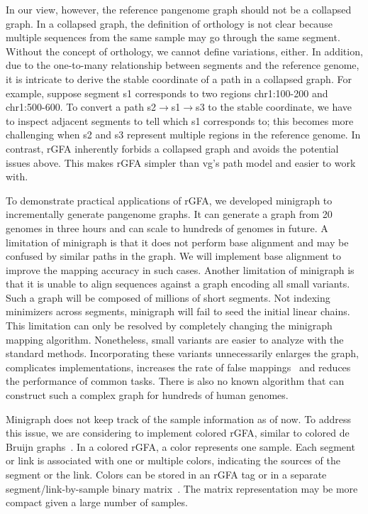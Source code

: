 \documentclass[twocolumn]{bmcart}
\begin{document}
In our view, however, the reference pangenome graph should not be a collapsed
graph. In a collapsed graph, the definition of orthology is not clear because
multiple sequences from the same sample may go through the same segment.
Without the concept of orthology, we cannot define variations, either.  In
addition, due to the one-to-many relationship between segments and the
reference genome, it is intricate to derive the stable coordinate of a path in
a collapsed graph. For example, suppose segment {\sf s1} corresponds to two
regions {\sf chr1:100-200} and {\sf chr1:500-600}. To convert a path {\sf
s2$\to$s1$\to$s3} to the stable coordinate, we have to inspect adjacent
segments to tell which {\sf s1} corresponds to; this becomes more challenging
when {\sf s2} and {\sf s3} represent multiple regions in the reference genome.
In contrast, rGFA inherently forbids a collapsed graph and avoids the potential
issues above. This makes rGFA simpler than vg's path model and easier to work
with.

To demonstrate practical applications of rGFA, we developed minigraph to
incrementally generate pangenome graphs. It can generate a graph from 20
genomes in three hours and can scale to hundreds of genomes in future. A
limitation of minigraph is that it does not perform base alignment and may be
confused by similar paths in the graph. We will implement base alignment to
improve the mapping accuracy in such cases. Another limitation of minigraph is
that it is unable to align sequences against a graph encoding all small variants.
Such a graph will be composed of millions of short segments. Not
indexing minimizers across segments, minigraph will fail to seed the initial
linear chains. This limitation can only be resolved by completely changing the
minigraph mapping algorithm. Nonetheless, small variants are easier to
analyze with the standard methods. Incorporating these variants unnecessarily
enlarges the graph, complicates implementations, increases the rate of false
mappings~\cite{Pritt_2018} and reduces the performance of common tasks. There
is also no known algorithm that can construct such a complex graph for hundreds
of human genomes.

Minigraph does not keep track of the sample information as of now. To address
this issue, we are considering to implement colored rGFA, similar to colored de
Bruijn graphs~\cite{Iqbal:2012aa}. In a colored rGFA, a color represents one
sample.  Each segment or link is associated with one or multiple colors,
indicating the sources of the segment or the link. Colors can be stored in an
rGFA tag or in a separate segment/link-by-sample binary
matrix~\cite{Holley695338}. The matrix representation may be more compact given
a large number of samples.
\end{document}

